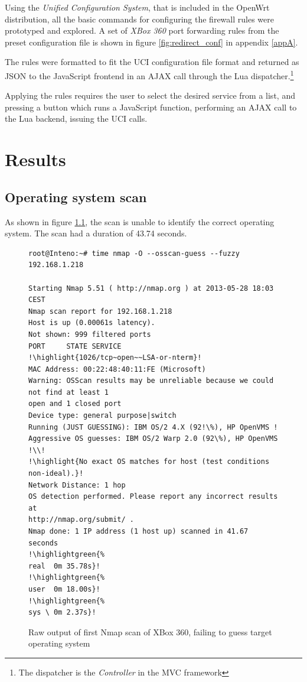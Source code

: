 \documentclass[g5paper,11pt]{kth-bcs}
\newcommand{\reducedstrut}{\vrule width 0pt height .9\ht\strutbox depth .9\dp\strutbox\relax}
\newcommand{\highlight}[1]{%
  \begingroup
  \colorbox{light-gray!20}{\footnotesize\ttfamily#1\/}%
  \endgroup
}
\newcommand{\highlightgreen}[1]{%
  \begingroup
  \colorbox{light-green!20}{#1\/}%
  \endgroup
}
\begin{document}
Using the \emph{Unified Configuration System}, that is included in the OpenWrt distribution, all the basic commands for configuring the firewall rules were prototyped and explored.
A set of \emph{XBox 360} port forwarding rules from the preset configuration file is shown in figure \ref{fig:redirect_conf} in appendix \ref{appA}.

The rules were formatted to fit the UCI configuration file format and returned as JSON to the JavaScript frontend in an AJAX call through the Lua dispatcher.\footnote{The dispatcher is the \emph{Controller} in the MVC framework}

Applying the rules requires the user to select the desired service from a list, and pressing a button which runs a JavaScript function, performing an AJAX call to the Lua backend, issuing the UCI calls.


\chapter{Results}
\section{Operating system scan}
As shown in figure \ref{fig:nmapos}, the scan is unable to identify the correct operating system. The scan had a duration of 43.74 seconds.

   \begin{figure}[ht]
      \centering
      \begin{lstlisting}[escapechar=!]
root@Inteno:~# time nmap -O --osscan-guess --fuzzy 192.168.1.218

Starting Nmap 5.51 ( http://nmap.org ) at 2013-05-28 18:03 CEST
Nmap scan report for 192.168.1.218
Host is up (0.00061s latency).
Not shown: 999 filtered ports
PORT     STATE SERVICE
!\highlight{1026/tcp~open~~LSA-or-nterm}!
MAC Address: 00:22:48:40:11:FE (Microsoft)
Warning: OSScan results may be unreliable because we could not find at least 1
open and 1 closed port
Device type: general purpose|switch
Running (JUST GUESSING): IBM OS/2 4.X (92!\%), HP OpenVMS !
Aggressive OS guesses: IBM OS/2 Warp 2.0 (92\%), HP OpenVMS !\\!
!\highlight{No exact OS matches for host (test conditions non-ideal).}!
Network Distance: 1 hop
OS detection performed. Please report any incorrect results at
http://nmap.org/submit/ .
Nmap done: 1 IP address (1 host up) scanned in 41.67 seconds
!\highlightgreen{%
real  0m 35.78s}!
!\highlightgreen{%
user  0m 18.00s}!
!\highlightgreen{%
sys \ 0m 2.37s}!
      \end{lstlisting}
      \caption{
         \small{
Raw output of first Nmap scan of XBox 360, failing to guess target operating system
         }
      }
      \label{fig:nmapos}
   \end{figure}
\end{document}
